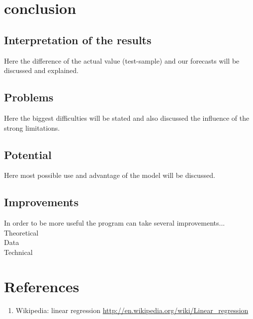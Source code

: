 \documentclass[12pt, a4paper]{article}
\begin{document}
\newpage
\section{conclusion}
\subsection{Interpretation of the results}
Here the difference of the actual value (test-sample) and our forecasts will be discussed and explained.
\subsection{Problems}
Here the biggest difficulties will be stated and also discussed the influence of the strong limitations.
\subsection{Potential}
Here most possible use and advantage of the model will be discussed.
\subsection{Improvements}
In order to be more useful the program can take several improvements...\\
Theoretical\\
Data\\
Technical

\newpage
\section{References}
\begin{enumerate}
	\item Wikipedia: linear regression \url{http://en.wikipedia.org/wiki/Linear_regression}
\end{enumerate}
\end{document}
